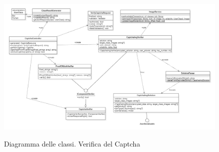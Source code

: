 
\begin{figure}[H]
	\centering
	\includegraphics[scale = 0.45]{img/verify.png}\\
	\caption{Diagramma delle classi. Verifica del Captcha}
\end{figure}

